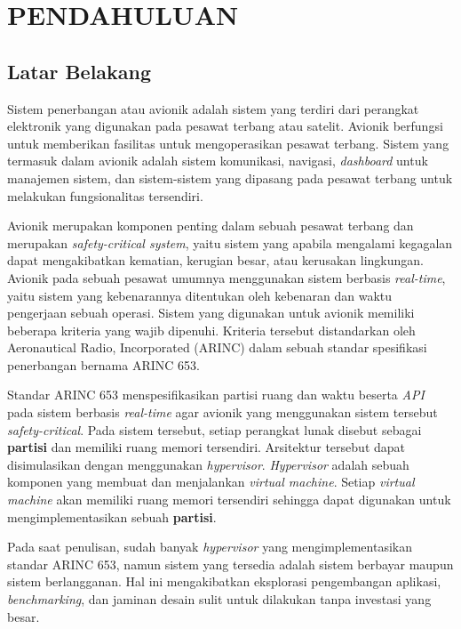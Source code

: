 \chapter{PENDAHULUAN}

\section{Latar Belakang}

Sistem penerbangan atau avionik adalah sistem yang terdiri dari perangkat elektronik yang digunakan pada pesawat terbang
atau satelit. Avionik berfungsi untuk memberikan fasilitas untuk mengoperasikan pesawat terbang. Sistem yang termasuk
dalam avionik adalah sistem komunikasi, navigasi, \textit{dashboard} untuk manajemen sistem, dan sistem-sistem yang
dipasang pada pesawat terbang untuk melakukan fungsionalitas tersendiri.

Avionik merupakan komponen penting dalam sebuah pesawat terbang dan merupakan \textit{safety-critical system}, yaitu
sistem yang apabila mengalami kegagalan dapat mengakibatkan kematian, kerugian besar, atau kerusakan lingkungan. Avionik
pada sebuah pesawat umumnya menggunakan sistem berbasis \textit{real-time}, yaitu sistem yang kebenarannya
ditentukan oleh kebenaran dan waktu pengerjaan sebuah operasi. Sistem yang digunakan untuk avionik memiliki
beberapa kriteria yang wajib dipenuhi. Kriteria tersebut distandarkan oleh Aeronautical Radio, Incorporated (ARINC)
dalam sebuah standar spesifikasi penerbangan bernama ARINC 653.

Standar ARINC 653 menspesifikasikan partisi ruang dan waktu beserta \textit{API} pada sistem berbasis \textit{real-time} agar avionik yang
menggunakan sistem tersebut \textit{safety-critical}. Pada sistem tersebut, setiap perangkat lunak disebut
sebagai \textbf{partisi} dan memiliki ruang memori tersendiri. Arsitektur tersebut dapat disimulasikan dengan
menggunakan \textit{hypervisor}. \textit{Hypervisor} adalah sebuah komponen yang membuat dan menjalankan \textit{virtual
machine}. Setiap \textit{virtual machine} akan memiliki ruang memori tersendiri sehingga dapat digunakan untuk
mengimplementasikan sebuah \textbf{partisi}.

Pada saat penulisan, sudah banyak \textit{hypervisor} yang mengimplementasikan standar ARINC 653, namun sistem yang
tersedia adalah sistem berbayar maupun sistem berlangganan. Hal ini mengakibatkan eksplorasi pengembangan aplikasi,
\textit{benchmarking}, dan jaminan desain sulit untuk dilakukan tanpa investasi yang besar.

